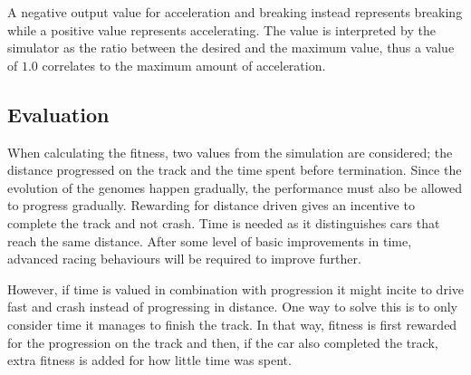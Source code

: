 A negative output value for acceleration and breaking instead represents breaking while a positive value represents accelerating. The value is interpreted by the simulator as the ratio between the desired and the maximum value, thus a value of $1.0$ correlates to the maximum amount of acceleration.


\subsection{Evaluation}


When calculating the fitness, two values from the simulation are considered; the distance progressed on the track and the time spent before termination. Since the evolution of the genomes happen gradually, the performance must also be allowed to progress gradually. Rewarding for distance driven gives an incentive to complete the track and not crash. Time is needed as it distinguishes cars that reach the same distance. After some level of basic improvements in time, advanced racing behaviours will be required to improve further. 

However, if time is valued in combination with progression it might incite to drive fast and crash instead of progressing in distance. One way to solve this is to only consider time it manages to finish the track. In that way, fitness is first rewarded for the progression on the track and then, if the car also completed the track, extra fitness is added for how little time was spent.

